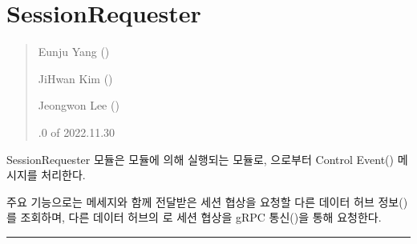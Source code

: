 \documentclass[a4paper,10pt,english]{sphinxmanual}
\begin{document}
\section{SessionRequester}
\label{\detokenize{_SessionRequester:sessionrequester}}\label{\detokenize{_SessionRequester:id1}}\label{\detokenize{_SessionRequester::doc}}\begin{quote}\begin{description}
\begin{DUlineblock}{0em}
\item[] Eunju Yang ()
\item[] JiHwan Kim ()
\item[] Jeongwon Lee ()
\end{DUlineblock}

.0 of 2022.11.30

\end{description}\end{quote}

\sphinxAtStartPar
SessionRequester 모듈은 {\hyperref[\detokenize{_SessionManager:sessionmanager}]{}} 모듈에 의해 실행되는 모듈로, {\hyperref[\detokenize{_SessionManager:sessionmanager}]{}} 으로부터 Control Event() 메시지를 처리한다.

\sphinxAtStartPar
주요 기능으로는  메세지와 함께 전달받은 세션 협상을 요청할 다른 데이터 허브 정보()를 조회하며, 다른 데이터 허브의 {\hyperref[\detokenize{_SessionListener:sessionlistener}]{}} 로 세션 협상을 gRPC 통신({\hyperref[\detokenize{_SessionNegotiationProto:sessionnegotiationproto}]{}})을 통해 요청한다.


\bigskip\hrule\bigskip

\end{document}
